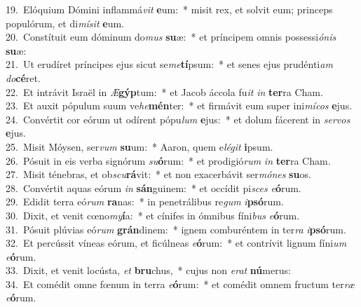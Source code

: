 {19.~}Elóquium Dómini inflammá\textit{vit} \textbf{e}um:~* misit rex, et solvit eum; princeps populórum, et di\textit{mí}\textit{sit} \textbf{e}um.\\
{20.~}Constítuit eum dóminum do\textit{mus} \textbf{su}æ:~* et príncipem omnis possessi\textit{ó}\textit{nis} \textbf{su}æ:\\
{21.~}Ut erudíret príncipes ejus sicut se\textit{me}\textbf{tí}psum:~* et senes ejus prudénti\textit{am} \textit{do}\textbf{cé}ret.\\
{22.~}Et intrávit Israël in \textit{Æ}\textbf{gýp}tum:~* et Jacob áccola fu\textit{it} \textit{in} \textbf{ter}ra Cham.\\
{23.~}Et auxit pópulum suum ve\textit{he}\textbf{mén}ter:~* et firmávit eum super ini\textit{mí}\textit{cos} \textbf{e}jus.\\
{24.~}Convértit cor eórum ut odírent pópu\textit{lum} \textbf{e}jus:~* et dolum fácerent in \textit{ser}\textit{vos} \textbf{e}jus.\\
{25.~}Misit Móysen, ser\textit{vum} \textbf{su}um:~* Aaron, quem e\textit{lé}\textit{git} \textbf{i}psum.\\
{26.~}Pósuit in eis verba signórum \textit{su}\textbf{ó}rum:~* et prodigió\textit{rum} \textit{in} \textbf{ter}ra Cham.\\
{27.~}Misit ténebras, et ob\textit{scu}\textbf{rá}vit:~* et non exacerbávit ser\textit{mó}\textit{nes} \textbf{su}os.\\
{28.~}Convértit aquas eórum \textit{in} \textbf{sán}guinem:~* et occídit pi\textit{sces} \textit{e}\textbf{ó}rum.\\
{29.~}Edidit terra eó\textit{rum} \textbf{ra}nas:~* in penetrálibus re\textit{gum} \textit{i}\textbf{psó}rum.\\
{30.~}Dixit, et venit cœno\textit{my}\textbf{í}a:~* et cínifes in ómnibus fíni\textit{bus} \textit{e}\textbf{ó}rum.\\
{31.~}Pósuit plúvias eó\textit{rum} \textbf{grán}dinem:~* ignem comburéntem in ter\textit{ra} \textit{i}\textbf{psó}rum.\\
{32.~}Et percússit víneas eórum, et ficúlneas \textit{e}\textbf{ó}rum:~* et contrívit lignum fíni\textit{um} \textit{e}\textbf{ó}rum.\\
{33.~}Dixit, et venit locústa, \textit{et} \textbf{bru}chus,~* cujus non \textit{e}\textit{rat} \textbf{nú}merus:\\
{34.~}Et comédit omne fœnum in terra \textit{e}\textbf{ó}rum:~* et comédit omnem fructum ter\textit{ræ} \textit{e}\textbf{ó}rum.\\
